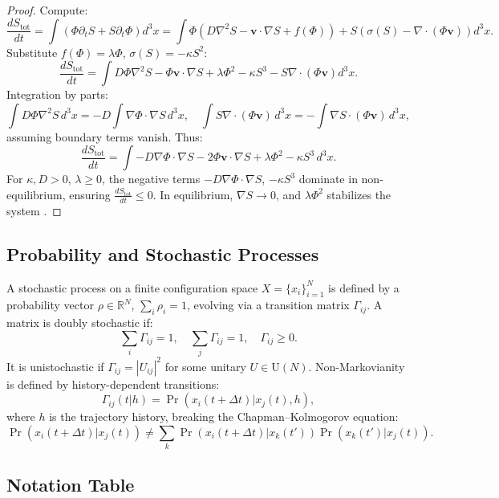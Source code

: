 \documentclass[12pt]{article}
\begin{document}
\begin{proof}
Compute:
\[
\frac{d S_{\text{tot}}}{dt} = \int \left( \Phi \partial_t S + S \partial_t \Phi \right) d^3x = \int \Phi \left( D \nabla^2 S - \mathbf{v} \cdot \nabla S + f(\Phi) \right) + S \left( \sigma(S) - \nabla \cdot (\Phi \mathbf{v}) \right) d^3x.
\]
Substitute \(f(\Phi) = \lambda \Phi\), \(\sigma(S) = -\kappa S^2\):
\[
\frac{d S_{\text{tot}}}{dt} = \int D \Phi \nabla^2 S - \Phi \mathbf{v} \cdot \nabla S + \lambda \Phi^2 - \kappa S^3 - S \nabla \cdot (\Phi \mathbf{v}) d^3x.
\]
Integration by parts:
\[
\int D \Phi \nabla^2 S \, d^3x = -D \int \nabla \Phi \cdot \nabla S \, d^3x, \quad \int S \nabla \cdot (\Phi \mathbf{v}) \, d^3x = -\int \nabla S \cdot (\Phi \mathbf{v}) \, d^3x,
\]
assuming boundary terms vanish. Thus:
\[
\frac{d S_{\text{tot}}}{dt} = \int -D \nabla \Phi \cdot \nabla S - 2 \Phi \mathbf{v} \cdot \nabla S + \lambda \Phi^2 - \kappa S^3 \, d^3x.
\]
For \(\kappa, D > 0\), \(\lambda \geq 0\), the negative terms \(-D \nabla \Phi \cdot \nabla S\), \(-\kappa S^3\) dominate in non-equilibrium, ensuring \(\frac{d S_{\text{tot}}}{dt} \leq 0\). In equilibrium, \(\nabla S \to 0\), and \(\lambda \Phi^2\) stabilizes the system \citep{Seifert2012}.
\end{proof}

\subsection{Probability and Stochastic Processes}

A stochastic process on a finite configuration space \(X = \{x_i\}_{i=1}^N\) is defined by a probability vector \(\rho \in \mathbb{R}^N\), \(\sum_i \rho_i = 1\), evolving via a transition matrix \(\Gamma_{ij}\). A matrix is doubly stochastic if:
\[
\sum_i \Gamma_{ij} = 1, \quad \sum_j \Gamma_{ij} = 1, \quad \Gamma_{ij} \geq 0.
\]
It is unistochastic if \(\Gamma_{ij} = |U_{ij}|^2\) for some unitary \(U \in \mathrm{U}(N)\). Non-Markovianity is defined by history-dependent transitions:
\[
\Gamma_{ij}(t | h) = \Pr(x_i(t + \Delta t) | x_j(t), h),
\]
where \(h\) is the trajectory history, breaking the Chapman–Kolmogorov equation:
\[
\Pr(x_i(t + \Delta t) | x_j(t)) \neq \sum_k \Pr(x_i(t + \Delta t) | x_k(t')) \Pr(x_k(t') | x_j(t)).
\]

\subsection{Notation Table}
\end{document}

